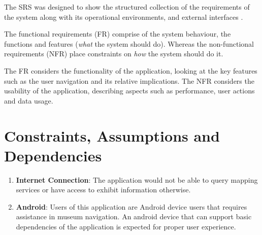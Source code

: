 

The SRS was designed to show the structured collection of the requirements of the system along with its operational environments, and external interfaces \cite{IEEE24765}. 

The functional requirements (FR) comprise of the system behaviour, the functions and features (\textit{what} the system should do). Whereas the non-functional requirements (NFR) place constraints on \textit{how} the system should do it.

The FR considers the functionality of the application, looking at the key features such as the user navigation and its relative implications. The NFR considers the usability of the application, describing aspects such as performance, user actions and data usage.

\section*{Constraints, Assumptions and Dependencies}
\begin{enumerate}
    \item \textbf{Internet Connection}: The application would not be able to query mapping services or have access to exhibit information otherwise.
    \item \textbf{Android}: Users of this application are Android device users that requires assistance in museum navigation. An android device that can support basic dependencies of the application is expected for proper user experience.
\end{enumerate}
